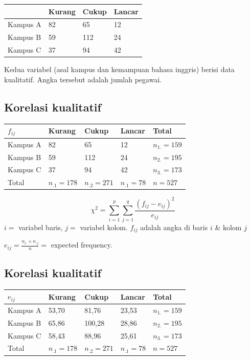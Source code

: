 \documentclass[
  letterpaper,
  DIV=11,
  numbers=noendperiod]{scrartcl}
\begin{document}
\begin{longtable}[]{@{}llll@{}}
\toprule\noalign{}
& Kurang & Cukup & Lancar \\
\midrule\noalign{}
\endhead
\bottomrule\noalign{}
\endlastfoot
Kampus A & 82 & 65 & 12 \\
Kampus B & 59 & 112 & 24 \\
Kampus C & 37 & 94 & 42 \\
\end{longtable}

Kedua variabel (asal kampus dan kemampuan bahasa inggris) berisi data
kualitatif. Angka tersebut adalah jumlah pegawai.

\hypertarget{korelasi-kualitatif-1}{%
\subsection{Korelasi kualitatif}\label{korelasi-kualitatif-1}}

\begin{longtable}[]{@{}lllll@{}}
\toprule\noalign{}
\(f_{ij}\) & Kurang & Cukup & Lancar & Total \\
\midrule\noalign{}
\endhead
\bottomrule\noalign{}
\endlastfoot
Kampus A & 82 & 65 & 12 & \(n_{1.}=159\) \\
Kampus B & 59 & 112 & 24 & \(n_{2.}=195\) \\
Kampus C & 37 & 94 & 42 & \(n_{3.}=173\) \\
Total & \(n_{.1}=178\) & \(n_{.2}=271\) & \(n_{.1}=78\) & \(n=527\) \\
\end{longtable}

\[
\chi^2=\sum_{i=1}^{p} \sum_{j=1}^{q} \frac{(f_{ij}-e_{ij})^2}{e_{ij}}
\] \(i=\) variabel baris, \(j=\) variabel kolom. \(f_{ij}\) adalah angka
di baris \(i\) \& kolom \(j\)

\(e_{ij}=\frac{n_{i.}\times n_{.j}}{n}=\) expected frequency.

\hypertarget{korelasi-kualitatif-2}{%
\subsection{Korelasi kualitatif}\label{korelasi-kualitatif-2}}

\begin{longtable}[]{@{}lllll@{}}
\toprule\noalign{}
\(e_{ij}\) & Kurang & Cukup & Lancar & Total \\
\midrule\noalign{}
\endhead
\bottomrule\noalign{}
\endlastfoot
Kampus A & 53,70 & 81,76 & 23,53 & \(n_{1.}=159\) \\
Kampus B & 65,86 & 100,28 & 28,86 & \(n_{2.}=195\) \\
Kampus C & 58,43 & 88,96 & 25,61 & \(n_{3.}=173\) \\
Total & \(n_{.1}=178\) & \(n_{.2}=271\) & \(n_{.1}=78\) & \(n=527\) \\
\end{longtable}
\end{document}
